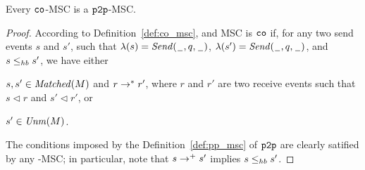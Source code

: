 \begin{proposition} \label{prop:co_is_pp}
	Every $\mathtt{co}$-MSC is a $\mathtt{p2p}$-MSC.
\end{proposition}
\begin{proof}
	According to Definition~\ref{def:co_msc}, and MSC is $\mathtt{co}$ if, for any two send events $s$ and $s'$, such that $\lambda(s)={\mathit{Send}(\hspace{0.1em}\underline{\hspace{0.5em}}\hspace{0.1em},q,\hspace{0.1em}\underline{\hspace{0.5em}}\hspace{0.1em})}$, $\lambda(s')={\mathit{Send}(\hspace{0.1em}\underline{\hspace{0.5em}}\hspace{0.1em},q,\hspace{0.1em}\underline{\hspace{0.5em}}\hspace{0.1em})}$, and $s \leq_{hb} s'$, we have either
	\begin{enumerate*}[label={(\roman*)}]
		\item $s,s' \in \mathit{Matched}(M)$ and $r \to^* r'$, where $r$ and $r'$ are two receive events such that $s \lhd r$ and $s' \lhd r'$, or
		\item $s' \in \mathit{Unm}(M)$.
	\end{enumerate*}
	The conditions imposed by the Definition~\ref{def:pp_msc} of $\mathtt{p2p}$ are clearly satified by any \co-MSC; in particular, note that $s \to^+ s'$ implies $s \leq_{hb} s'$.
\end{proof}

